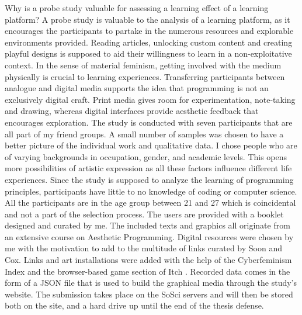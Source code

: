 Why is a probe study valuable for assessing a learning effect of a learning platform?
A probe study is valuable to the analysis of a learning platform, as it encourages the participants to partake in the numerous resources and explorable environments provided. Reading articles, unlocking custom content and creating playful designs is supposed to aid their willingness to learn in a non-exploitative context. In the sense of material feminism, getting involved with the medium physically is crucial to learning experiences.   Transferring participants between analogue and digital media supports the idea that programming is not an exclusively digital craft. Print media gives room for experimentation, note-taking and drawing, whereas digital interfaces provide aesthetic feedback that encourages exploration.
The study is conducted with seven participants that are all part of my friend groups. A small number of samples was chosen to have a better picture of the individual work and qualitative data. I chose people who are of varying backgrounds in occupation, gender, and academic levels. This opens more possibilities of artistic expression as all these factors influence different life experiences. Since the study is supposed to analyze the learning of programming principles, participants have little to no knowledge of coding or computer science. All the participants are in the age group between 21 and 27 which is coincidental and not a part of the selection process. 
The users are provided with a booklet designed and curated by me. The included texts and graphics all originate from an extensive course on Aesthetic Programming.  Digital resources were chosen by me with the motivation to add to the multitude of links curated by Soon and Cox. Links and art installations were added with the help of the Cyberfeminism Index  and the browser-based game section of Itch . Recorded data comes in the form of a JSON file that is used to build the graphical media through the study’s website.  The submission takes place on the SoSci servers and will then be stored both on the site, and a hard drive up until the end of the thesis defense.

